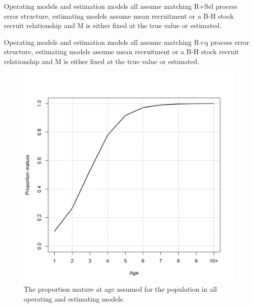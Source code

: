 \documentclass[
  12pt,
]{article}
\begin{document}
\begin{table}
\caption{Operating models and estimation models all assume matching R+Sel process error structure, estimating models assume mean recruitment or a B-H stock recruit relationship and M is either fixed at the true value or estimated.}\label{Sel_om_em_R_BH_aic_table}
{}
\end{table}

\begin{table}
\caption{Operating models and estimation models all assume matching R+q process error structure, estimating models assume mean recruitment or a B-H stock recruit relationship and M is either fixed at the true value or estimated.}\label{q_om_em_R_BH_aic_table}
{}
\end{table}

\clearpage

\begin{figure}
\caption{The proportion mature at age assumed for the population in all operating and estimating models.}\label{om_maturity}
\begin{center}
\includegraphics[width = \textwidth]{om_maturity.png}
\end{center}
\end{figure}
\end{document}
